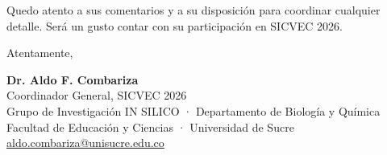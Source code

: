 \documentclass[11pt,a4paper]{article}
\begin{document}
\vspace{0.3cm}

Quedo atento a sus comentarios y a su disposición para coordinar cualquier detalle. Será un gusto contar con su participación en SICVEC 2026.

\vspace{0.35cm}

Atentamente,

\vspace{0.35cm}

\textbf{Dr. Aldo F. Combariza}\\
Coordinador General, SICVEC 2026\\
Grupo de Investigación IN SILICO · Departamento de Biología y Química\\
Facultad de Educación y Ciencias · Universidad de Sucre\\
\href{mailto:aldo.combariza@unisucre.edu.co}{aldo.combariza@unisucre.edu.co}

\vspace{0.2cm}
\end{document}
